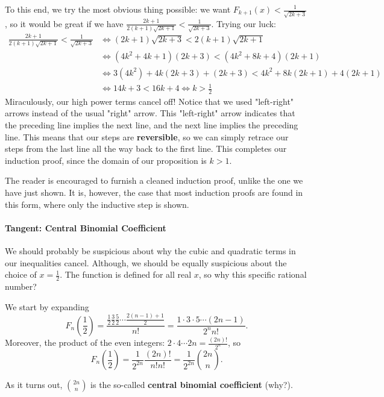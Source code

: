 \documentclass[../jarvis.tex]{subfiles}
\begin{document}
    To this end, we try the most obvious thing possible: we want $F_{k+1}(x) < \frac{1}{\sqrt{2k+3}}$, so it would be great if we have $\frac{2k+1}{2(k+1)\sqrt{2k+1}}<\frac{1}{\sqrt{2k+3}}$. Trying our luck:
    \begin{align*}
        \frac{2k+1}{2(k+1)\sqrt{2k+1}} < \frac{1}{\sqrt{2k+3}}
        &\Longleftrightarrow (2k+1)\sqrt{2k+3} < 2(k+1)\sqrt{2k+1} \\
        &\Longleftrightarrow (4k^2+4k+1)(2k+3) < (4k^2+8k+4)(2k+1) \\
        &\Longleftrightarrow 3(4k^2)+4k(2k+3)+(2k+3) < 4k^2+8k(2k+1)+4(2k+1) \\
        &\Longleftrightarrow 14k+3 < 16k+4 \Longleftrightarrow k > \frac{1}{2}
    \end{align*}
    Miraculously, our high power terms cancel off! Notice that we used "left-right" arrows instead of the usual "right" arrow. This "left-right" arrow indicates that the preceding line implies the next line, and the next line implies the preceding line. This means that our steps are \textbf{reversible}, so we can simply retrace our steps from the last line all the way back to the first line. This completes our induction proof, since the domain of our proposition is $k > 1$.

    The reader is encouraged to furnish a cleaned induction proof, unlike the one we have just shown. It is, however, the case that most induction proofs are found in this form, where only the inductive step is shown.
    \paragraph{Tangent: Central Binomial Coefficient}\label{algebra-cbc}
    We should probably be suspicious about why the cubic and quadratic terms in our inequalities cancel. Although, we should be equally suspicious about the choice of $x=\frac{1}{2}$. The function is defined for all real $x$, so why this specific rational number?
    
    We start by expanding $$F_n\left(\frac{1}{2}\right)=\frac{\frac{1}{2}\frac{3}{2}\frac{5}{2}\cdots\frac{2(n-1)+1}{2}}{n!}=\frac{1\cdot3\cdot5\cdots(2n-1)}{2^nn!}.$$
    Moreover, the product of the even integers: $2\cdot4\cdots2n=\frac{(2n)!}{2^n}$, so $$F_n\left(\frac{1}{2}\right)=\frac{1}{2^{2n}}\frac{(2n)!}{n!n!}=\frac{1}{2^{2n}}\binom{2n}{n}.$$
    
    As it turns out, $\binom{2n}{n}$ is the so-called \textbf{central binomial coefficient} (why?).
    
\end{document}
